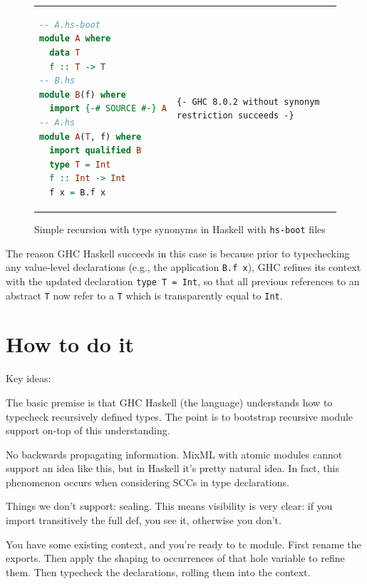 \begin{figure}[H]
\begin{tabular}{p{} p{}}
\begin{lstlisting}[language=Haskell,escapechar=@]
-- A.hs-boot
module A where
  data T
  f :: T -> T
-- B.hs
module B(f) where
  import {-# SOURCE #-} A
-- A.hs
module A(T, f) where
  import qualified B
  type T = Int
  f :: Int -> Int
  f x = B.f x
\end{lstlisting}
&
\begin{verbatim}
{- GHC 8.0.2 without synonym restriction succeeds -}
\end{verbatim}
\end{tabular}
\caption{Simple recursion with type synonyms in Haskell with \texttt{hs-boot} files}
\label{fig:double-vision-simple-recursion-with-type-synonyms-haskell-hs-boot}
\end{figure}

\noindent
The reason GHC Haskell succeeds in this case is because prior to typechecking
any value-level declarations (e.g., the application \verb|B.f x|), GHC refines
its context with the updated declaration \verb|type T = Int|, so that all
previous references to an abstract \verb|T| now refer to a \verb|T| which
is transparently equal to \verb|Int|.

\section{How to do it}

Key ideas:

The basic premise is that GHC Haskell (the language) understands how to
typecheck recursively defined types.  The point is to bootstrap recursive
module support on-top of this understanding.



No backwards propagating information.  MixML with atomic modules cannot support
an idea like this, but in Haskell it's pretty natural idea. In fact, this phenomenon
occurs when considering SCCs in type declarations.

Things we don't support: sealing.  This means visibility is very clear:
if you import transitively the full def, you see it, otherwise you don't.

You have some existing context, and you're ready to tc module.
First rename the exports. Then apply the shaping to occurrences
of that hole variable to refine them.  Then typecheck the declarations,
rolling them into the context.


